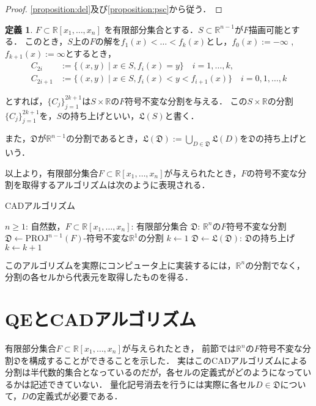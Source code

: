 \documentclass[uplatex, dvipdfmx]{jsarticle}
\newcommand{\R}{\mathbb{R}}
\newcommand{\PROJ}{\mathrm{PROJ}}
\theoremstyle{definition}
\newtheorem{definition}{定義}[section]
\begin{document}
\begin{proof}
\cref{proposition:del}及び\cref{proposition:psc}から従う．
\end{proof}

\begin{definition}
$ F \subset \mathbb{R}[x_1,\dots,x_n] $ を有限部分集合とする．$ S \subset \mathbb{R}^{n-1} $が$ F $描画可能とする．
このとき，$ S $上の$ F $の解を$ f_1(x)< \dots <f_k(x) $とし，$ f_0(x) := -\infty $ , $ f_{k+1}(x) := \infty $とするとき，
\begin{align*}
  C_{2i} &:= \{(x,y) \mid  x \in S, f_i(x) = y \} \quad i = 1,\dots, k,\\
  C_{2i+1} &:= \{(x,y) \mid x \in S, f_{i}(x)<y<f_{i+1}(x) \} \quad i = 0,1, \dots, k 
\end{align*}

とすれば，$\{C_j\}_{j=1}^{2k+1}$は$ S \times \mathbb{R} $の$F$符号不変な分割を与える．
この$ S \times \mathbb{R} $の分割$ \{C_j\}_{j=1}^{2k+1} $を，$ S $の持ち上げといい，$ \mathfrak{L}(S) $と書く．

また，$\mathfrak{D}$が$\R^{n-1}$の分割であるとき，$\mathfrak{L}(\mathfrak{D}) := \bigcup_{D \in \mathfrak{D}}\mathfrak{L}(D)$を$\mathfrak{D}$の持ち上げという．
\end{definition}

以上より，有限部分集合$F \subset \R[x_1, \dots, x_n]$が与えられたとき，$F$の符号不変な分割を取得するアルゴリズムは次のように表現される．

\begin{algorithm}
    \caption{CADアルゴリズム}
    \begin{algorithmic}[1]
    \REQUIRE $n \geq 1$: 自然数，$F \subset \R[x_1, \dots, x_n]$: 有限部分集合
    \ENSURE $\mathfrak{D}$: $\R^n$の$F$符号不変な分割
    \STATE $\mathfrak{D} \leftarrow \text{$\PROJ^{n-1}(F)$-符号不変な$\R^1$の分割}$
    \STATE $k \leftarrow 1$
    \STATE $\mathfrak{D} \leftarrow \text{$\mathfrak{L}(\mathfrak{D})$: $\mathfrak{D}$の持ち上げ}$
    \STATE $k \leftarrow k+1$
    \ENDWHILE
    \end{algorithmic}
\end{algorithm}

このアルゴリズムを実際にコンピュータ上に実装するには，$\R^n$の分割でなく，分割の各セルから代表元を取得したものを得る．
\section{QEとCADアルゴリズム}
有限部分集合$F \subset \R[x_1, \dots, x_n]$が与えられたとき，
前節では$\R^n$の$F$符号不変な分割$\mathfrak{D}$を構成することができることを示した．
実はこのCADアルゴリズムによる分割は半代数的集合となっているのだが，各セルの定義式がどのようになっているかは記述できていない．
量化記号消去を行うには実際に各セル$D \in \mathfrak{D}$について，$D$の定義式が必要である．
\end{document}
